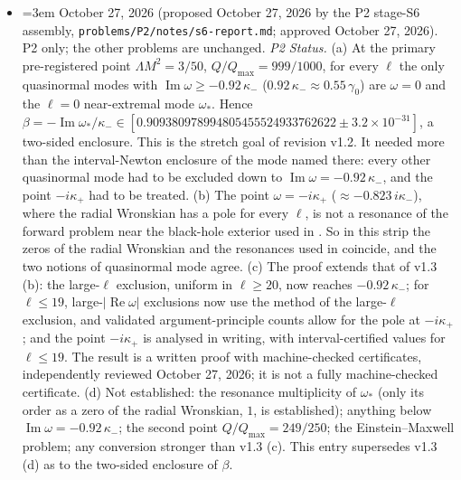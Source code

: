 \documentclass[11pt,letterpaper]{article}
\begin{document}
\begin{itemize}[leftmargin=2.6em,itemsep=1pt,topsep=2pt]
\item[v1.4] {\emergencystretch=3em October 27, 2026 (proposed October 27, 2026 by the P2 stage-S6 assembly, \texttt{problems/\allowbreak P2/\allowbreak notes/\allowbreak s6-report.md}; approved October 27, 2026). P2 only; the other problems are unchanged. \emph{P2 Status.} (a) At the primary pre-registered point $\Lambda M^2=3/50$, $Q/Q_{\max}=999/1000$, for every $\ell$ the only quasinormal modes with $\operatorname{Im}\omega\ge-0.92\,\kappa_-$ ($0.92\,\kappa_-\approx0.55\,\gamma_0$) are $\omega=0$ and the $\ell=0$ near-extremal mode $\omega_*$. Hence $\beta=-\operatorname{Im}\omega_*/\kappa_-\in[0.909380978994805455524933762622\pm3.2\times10^{-31}]$, a two-sided enclosure. This is the stretch goal of revision v1.2. It needed more than the interval-Newton enclosure of the mode named there: every other quasinormal mode had to be excluded down to $\operatorname{Im}\omega=-0.92\,\kappa_-$, and the point $-i\kappa_+$ had to be treated. (b) The point $\omega=-i\kappa_+$ ($\approx-0.823\,i\kappa_-$), where the radial Wronskian has a pole for every $\ell$, is not a resonance of the forward problem near the black-hole exterior used in \cite{hintzvasy2017}. So in this strip the zeros of the radial Wronskian and the resonances used in \cite{hintzvasy2017} coincide, and the two notions of quasinormal mode agree. (c) The proof extends that of v1.3 (b): the large-$\ell$ exclusion, uniform in $\ell\ge20$, now reaches $-0.92\,\kappa_-$; for $\ell\le19$, large-$|\operatorname{Re}\omega|$ exclusions now use the method of the large-$\ell$ exclusion, and validated argument-principle counts allow for the pole at $-i\kappa_+$; and the point $-i\kappa_+$ is analysed in writing, with interval-certified values for $\ell\le19$. The result is a written proof with machine-checked certificates, independently reviewed October 27, 2026; it is not a fully machine-checked certificate. (d) Not established: the resonance multiplicity of $\omega_*$ (only its order as a zero of the radial Wronskian, $1$, is established); anything below $\operatorname{Im}\omega=-0.92\,\kappa_-$; the second point $Q/Q_{\max}=249/250$; the Einstein--Maxwell problem; any conversion stronger than v1.3 (c). This entry supersedes v1.3 (d) as to the two-sided enclosure of $\beta$.\par}
\end{itemize}
\end{document}
